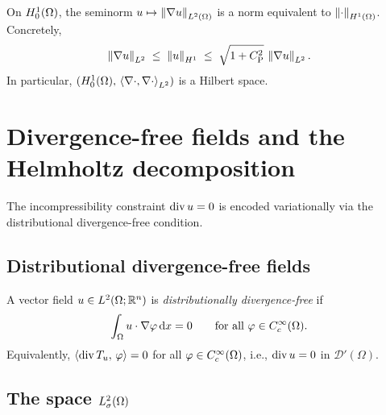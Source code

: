 \begin{corollary}\label{cor:poincare-norm}
  On $H^{1}_0(\Omega)$, the seminorm $u \mapsto \left\lVert \nabla u \right\rVert_{L^{2}(\Omega)}$ is a
  norm equivalent to $\left\lVert \cdot \right\rVert_{H^{1}(\Omega)}$.  Concretely,
  \begin{equation}\label{eq:poincare-equivalence}
    \left\lVert \nabla u \right\rVert_{L^{2}}
    \;\le\;
    \left\lVert u \right\rVert_{H^{1}}
    \;\le\;
    \sqrt{1 + C_{\mathrm{P}}^{2}}\,\left\lVert \nabla u \right\rVert_{L^{2}}.
  \end{equation}
  In particular, $(H^{1}_0(\Omega),\, \left\langle \nabla \cdot, \nabla \cdot \right\rangle_{L^{2}})$ is a
  Hilbert space.
\end{corollary}

\section[Divergence-free fields and Helmholtz]{Divergence-free fields and the Helmholtz decomposition}%
\label{sec:helmholtz}

The incompressibility constraint $\operatorname{div} u = 0$ is encoded variationally via the
distributional divergence-free condition.

\subsection{Distributional divergence-free fields}

\begin{definition}%
  \label{def:distrib-divfree}
  A vector field $u \in L^{2}(\Omega;\mathbb{R}^{n})$ is \emph{distributionally divergence-free}
  if
  \begin{equation}\label{eq:distrib-divfree}
    \int_{\Omega} u \cdot \nabla \varphi \,\mathrm{d} x = 0
    \qquad \text{for all } \varphi \in C^\infty_c(\Omega).
  \end{equation}
  Equivalently, $\langle \operatorname{div} T_{u},\, \varphi \rangle = 0$ for all $\varphi \in
  C^\infty_c(\Omega)$, i.e., $\operatorname{div} u = 0$ in $\mathcal{D}'(\Omega)$.
\end{definition}

\subsection{The space $L^{2}_\sigma(\Omega)$}

